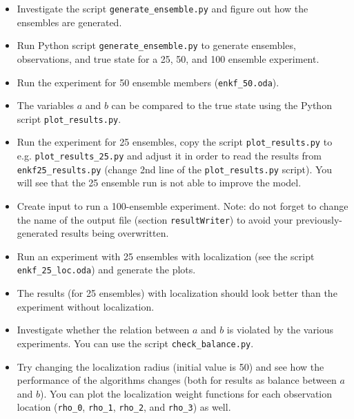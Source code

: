 \begin{itemize}
\item Investigate the script {\tt generate\_ensemble.py} and figure out how the ensembles are generated.
\item Run Python script {\tt generate\_ensemble.py} to generate ensembles, observations, and true state for a 25, 50, and 100 ensemble experiment.  
\item Run the experiment for 50 ensemble members ({\tt enkf\_50.oda}).
\item The variables $a$ and $b$ can be compared to the true state using the Python script {\tt plot\_results.py}.
\item Run the experiment for 25 ensembles, copy the script {\tt plot\_results.py} to e.g. {\tt plot\_results\_25.py} and adjust it in order to read the results from {\tt enkf25\_results.py} (change 2nd line of the {\tt plot\_results.py} script). You will see that the 25 ensemble run is not able to improve the model.
\item Create input to run a 100-ensemble experiment. Note: do not forget to change the name of the output file (section {\tt resultWriter}) 
to avoid your previously-generated results being overwritten. 
\item Run an experiment with 25 ensembles with localization (see the script {\tt enkf\_25\_loc.oda}) and generate the plots.
\item The results (for 25 ensembles) with localization should look better than the experiment without localization.
\item Investigate whether the relation between $a$ and $b$ is violated by the various experiments. You can use the script {\tt check\_balance.py}.
\item Try changing the localization radius (initial value is 50) and see how the performance of the algorithms changes (both for results as balance between $a$ and $b$). You can plot the localization weight functions for each observation location ({\tt rho\_0}, {\tt rho\_1}, {\tt rho\_2}, and {\tt rho\_3}) as well.
\end{itemize}








